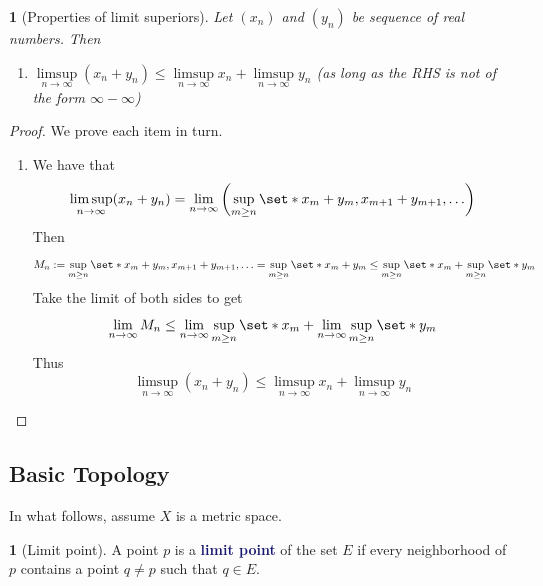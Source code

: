 \documentclass[11pt]{article}
\numberwithin{equation}{section}
\newcommand{\navy}[1]{\textcolor{MidnightBlue}{\bf #1}}
\theoremstyle{plain}
\newtheorem{theorem}{\color{ForestGreen}{\textbf{Theorem}}}[section]
\theoremstyle{definition}
\newtheorem{definition}{\color{MidnightBlue}{\textbf{Definition}}}[section]
\newcommand\parens[1]{\left( #1 \right)}
\def\Set{\set*}%
\newcommand{\1}{\mathbbm 1}
\begin{document}
\begin{theorem}[Properties of limit superiors]
	Let $\parens{x_n}$ and $\parens{y_n}$ be sequence of real numbers. Then
	\begin{enumerate}
		\item $\limsup\limits_{n \to \infty}(x_n + y_n) \leq \limsup\limits_{n \to \infty} x_n + \limsup\limits_{n \to \infty} y_n$ (as long as the RHS is not of the form $\infty - \infty$)
	\end{enumerate}
\end{theorem}
\begin{proof}
	We prove each item in turn.
	\begin{enumerate}
		\item We have that
		\begin{equation}
			\limsup\limits_{n \to \infty}(x_n + y_n) = \lim_{n \to \infty}\parens{\sup_{m \geq n}\Set{x_m + y_m, x_{m+1} + y_{m+1}, \ldots}}
		\end{equation}
		Then 
		\begin{equation}
			M_n := \sup_{m \geq n}\Set{x_m + y_m, x_{m+1} + y_{m+1}, \ldots} = \sup_{m \geq n}\Set{x_m + y_m} \leq \sup_{m \geq n}\Set{x_m} + \sup_{m \geq n}\Set{y_m}
		\end{equation}
		Take the limit of both sides to get
		\begin{equation}
			\lim_{n \to \infty} M_n \leq \lim_{n \to \infty} \sup_{m \geq n} \Set{x_m} + \lim_{n \to \infty} \sup_{m \geq n} \Set{y_m}
		\end{equation}
		Thus 
		\begin{equation}
			\limsup\limits_{n \to \infty}(x_n + y_n) \leq \limsup\limits_{n \to \infty} x_n + \limsup\limits_{n \to \infty} y_n
		\end{equation}
	\end{enumerate}
\end{proof}



\subsection{Basic Topology}

In what follows, assume $X$ is a metric space. 

\begin{definition}[Limit point]
	A point $p$ is a \navy{limit point} of the set $E$ if every neighborhood of $p$ contains a point $q \neq p$ such that $q \in E$.
\end{definition}
\end{document}
